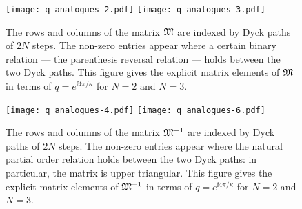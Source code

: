 \documentclass[oneside,english]{amsart}
\numberwithin{equation}{section}
\numberwithin{figure}{section}
\theoremstyle{plain}
\theoremstyle{plain}
\theoremstyle{plain}
\theoremstyle{remark}
\theoremstyle{plain}
\theoremstyle{plain}
\theoremstyle{plain}
\theoremstyle{plain}
\theoremstyle{plain}
\theoremstyle{plain}
\theoremstyle{plain}
\theoremstyle{plain}
\newcommand{\blue}[1]{{\color{blue} #1}}
\begin{document}
\begin{figure}
\centerfloat
\texttt{[image: q\_analogues-2.pdf]} %
\hspace{0.5 cm}
\texttt{[image: q\_analogues-3.pdf]} %
\caption{\label{fig: quantum KW matrices only}
The rows and columns of the matrix $\mathfrak{M}$ are indexed by Dyck
paths of $2N$ steps. The non-zero entries appear where a certain binary
relation --- the parenthesis reversal relation --- holds between the two Dyck paths.
This figure gives the explicit matrix elements
of $\mathfrak{M}$ in terms of $q = e^{\ii 4 \pi / \kappa}$
for %
$N=2$ and $N=3$.
}
\end{figure}
%
\begin{figure}
\centerfloat
\texttt{[image: q\_analogues-4.pdf]} %
\hspace{0.5 cm}
\texttt{[image: q\_analogues-6.pdf]} %
\caption{\label{fig: quantum CIDT matrices only}
The rows and columns of the matrix $\mathfrak{M}^{-1}$ are indexed by Dyck
paths of $2N$ steps. The non-zero entries appear where the natural partial order
relation holds between the two Dyck paths: in particular, the matrix is upper triangular.
This figure gives the explicit matrix elements
of $\mathfrak{M}^{-1}$ in terms of $q = e^{\ii 4 \pi / \kappa}$
for %
$N=2$ and $N=3$.
}
\end{figure}
\end{document}
